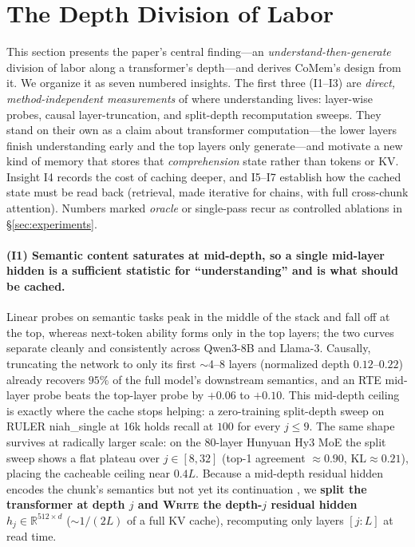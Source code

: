 \section{The Depth Division of Labor}
\label{sec:motivation}
This section presents the paper's central finding---an \emph{understand-then-generate}
division of labor along a transformer's depth---and derives CoMem's design from
it. We organize it as seven numbered insights. The first three (I1--I3) are
\emph{direct, method-independent measurements} of where understanding lives:
layer-wise probes, causal layer-truncation, and split-depth recomputation
sweeps. They stand on their own as a claim about transformer computation---the
lower layers finish understanding early and the top layers only generate---and
motivate a new kind of memory that stores that \emph{comprehension} state rather
than tokens or KV. Insight I4 records the cost of caching deeper, and I5--I7
establish how the cached state must be read back (retrieval, made iterative for
chains, with full cross-chunk attention). Numbers marked \emph{oracle} or
single-pass recur as controlled ablations in \S\ref{sec:experiments}.

\paragraph{(I1) Semantic content saturates at mid-depth, so a single mid-layer
hidden is a sufficient statistic for ``understanding'' and is what should be
cached.} Linear probes on semantic tasks peak in the middle of the stack and
fall off at the top, whereas next-token ability forms only in the top layers;
the two curves separate cleanly and consistently across Qwen3-8B and Llama-3.
Causally, truncating the network to only its first $\sim$4--8 layers (normalized
depth $0.12$--$0.22$) already recovers $95\%$ of the full model's downstream
semantics, and an RTE mid-layer probe beats the top-layer probe by
$+0.06$ to $+0.10$. This mid-depth ceiling is exactly where the cache stops
helping: a zero-training split-depth sweep on RULER \citep{ruler}
niah\_single at 16k holds recall at $100$ for every $j\le 9$. The same shape
survives at radically larger scale: on the 80-layer Hunyuan Hy3 MoE the split
sweep shows a flat plateau over $j\in[8,32]$ (top-1 agreement $\approx0.90$,
$\mathrm{KL}\approx0.21$), placing the cacheable ceiling near $0.4L$. Because a
mid-depth residual hidden encodes the chunk's semantics but not yet its
continuation \citep{stagesofinference}, we \textbf{split the transformer at
depth $j$ and \textsc{Write} the depth-$j$ residual hidden}
$h_j\in\mathbb{R}^{512\times d}$ ($\sim$$1/(2L)$ of a full KV cache),
recomputing only layers $[j{:}L]$ at read time.

